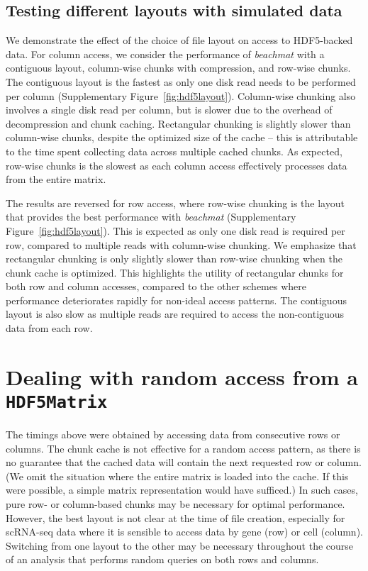 \documentclass{article}
\newcommand{\beachmat}{\textit{beachmat}}
\begin{document}
\subsection{Testing different layouts with simulated data}
We demonstrate the effect of the choice of file layout on access to HDF5-backed data.
For column access, we consider the performance of \beachmat{} with a contiguous layout, column-wise chunks with compression, and row-wise chunks.
The contiguous layout is the fastest as only one disk read needs to be performed per column (Supplementary Figure~\ref{fig:hdf5layout}).
Column-wise chunking also involves a single disk read per column, but is slower due to the overhead of decompression and chunk caching.
Rectangular chunking is slightly slower than column-wise chunks, despite the optimized size of the cache -- this is attributable to the time spent collecting data across multiple cached chunks.
As expected, row-wise chunks is the slowest as each column access effectively processes data from the entire matrix.

The results are reversed for row access, where row-wise chunking is the layout that provides the best performance with \beachmat{} (Supplementary Figure~\ref{fig:hdf5layout}).
This is expected as only one disk read is required per row, compared to multiple reads with column-wise chunking.
We emphasize that rectangular chunking is only slightly slower than row-wise chunking when the chunk cache is optimized.
This highlights the utility of rectangular chunks for both row and column accesses, compared to the other schemes where performance deteriorates rapidly for non-ideal access patterns.
The contiguous layout is also slow as multiple reads are required to access the non-contiguous data from each row.

\section{Dealing with random access from a \texttt{HDF5Matrix}}
\label{sec:random}

The timings above were obtained by accessing data from consecutive rows or columns.
The chunk cache is not effective for a random access pattern, as there is no guarantee that the cached data will contain the next requested row or column.
(We omit the situation where the entire matrix is loaded into the cache.
If this were possible, a simple matrix representation would have sufficed.)
In such cases, pure row- or column-based chunks may be necessary for optimal performance.
However, the best layout is not clear at the time of file creation, especially for scRNA-seq data where it is sensible to access data by gene (row) or cell (column).
Switching from one layout to the other may be necessary throughout the course of an analysis that performs random queries on both rows and columns.
\end{document}
